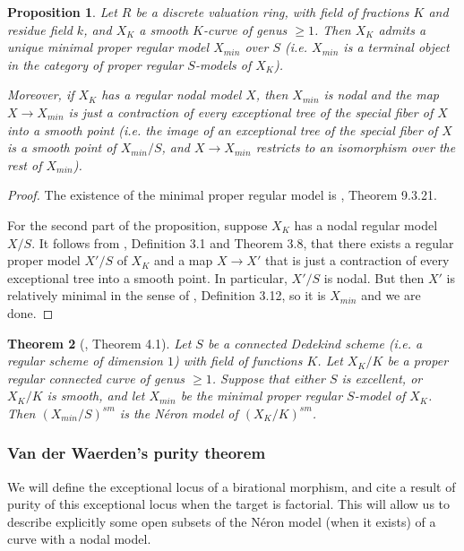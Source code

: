 \documentclass[a4paper,10pt,twoside]{article}
\newcommand{\ra}{\rightarrow}
\newtheorem{thm}{Theorem}[section]
\newtheorem{prop}[thm]{Proposition}
\theoremstyle{definition}
\theoremstyle{remark}
\begin{document}
\begin{prop}\label{prop existence et forme du modele propre regulier minimal}
	Let $R$ be a discrete valuation ring, with field of fractions $K$ and residue field $k$, and $X_K$ a smooth $K$-curve of genus $\geq 1$. Then $X_K$ admits a unique minimal proper regular model $X_{min}$ over $S$ (i.e. $X_{min}$ is a terminal object in the category of proper regular $S$-models of $X_K$).
	
	Moreover, if $X_K$ has a regular nodal model $X$, then $X_{min}$ is nodal and the map $X\ra X_{min}$ is just a contraction of every exceptional tree of the special fiber of $X$ into a smooth point (i.e. the image of an exceptional tree of the special fiber of $X$ is a smooth point of $X_{min}/S$, and $X\ra X_{min}$ restricts to an isomorphism over the rest of $X_{min}$).
\end{prop}

\begin{proof}
	The existence of the minimal proper regular model is \cite{Liu}, Theorem 9.3.21.
	
	For the second part of the proposition, suppose $X_K$ has a nodal regular model $X/S$. It follows from \cite{Liu}, Definition 3.1 and Theorem 3.8, that there exists a regular proper model $X'/S$ of $X_K$ and a map $X\ra X'$ that is just a contraction of every exceptional tree into a smooth point. In particular, $X'/S$ is nodal. But then $X'$ is relatively minimal in the sense of \cite{Liu}, Definition 3.12, so it is $X_{min}$ and we are done.
\end{proof}

\begin{thm}[\cite{LiuTong}, Theorem 4.1]\label{Theorem LiuTong}
Let $S$ be a connected Dedekind scheme (i.e. a regular scheme of dimension $1$) with field of functions $K$. Let $X_K/K$ be a proper regular connected curve of genus $\geq 1$. Suppose that either $S$ is excellent, or $X_K/K$ is smooth, and let $X_{min}$ be the minimal proper regular $S$-model of $X_K$. Then $(X_{min}/S)^{sm}$ is the N\'eron model of $(X_K/K)^{sm}$.
\end{thm}

\subsubsection{Van der Waerden's purity theorem}

We will define the exceptional locus of a birational morphism, and cite a result of purity of this exceptional locus when the target is factorial. This will allow us to describe explicitly some open subsets of the N\'eron model (when it exists) of a curve with a nodal model.
\end{document}
